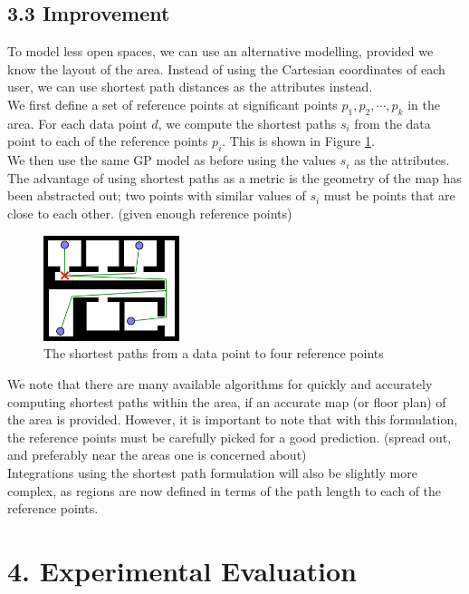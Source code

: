 \documentclass[letterpaper]{article}
\begin{document}
\subsection{3.3  Improvement}

To model less open spaces, we can use an alternative modelling, provided we know the layout of the area. Instead of using the Cartesian coordinates of each user, we can use shortest path distances as the attributes instead. \\

We first define a set of reference points at significant points $p_1,p_2,\cdots,p_k$ in the area. For each data point $d$, we compute the shortest paths $s_i$ from the data point to each of the reference points $p_i$. This is shown in Figure \ref{fig:spaths}. \\

We then use the same GP model as before using the values $s_i$ as the attributes. The advantage of using shortest paths as a metric is the geometry of the map has been abstracted out; two points with similar values of $s_i$ must be points that are close to each other. (given enough reference points)

\begin{figure}[h!]
  \centering
    \includegraphics[width=150px,natwidth=570,natheight=442]{shortestpaths.png}
  \caption{The shortest paths from a data point to four reference points}
  \label{fig:spaths}
\end{figure}

We note that there are many available algorithms for quickly and accurately computing shortest paths within the area, if an accurate map (or floor plan) of the area is provided. However, it is important to note that with this formulation, the reference points must be carefully picked for a good prediction. (spread out, and preferably near the areas one is concerned about)\\

Integrations using the shortest path formulation will also be slightly more complex, as regions are now defined in terms of the path length to each of the reference points.

\section{4.  Experimental Evaluation}
\end{document}
